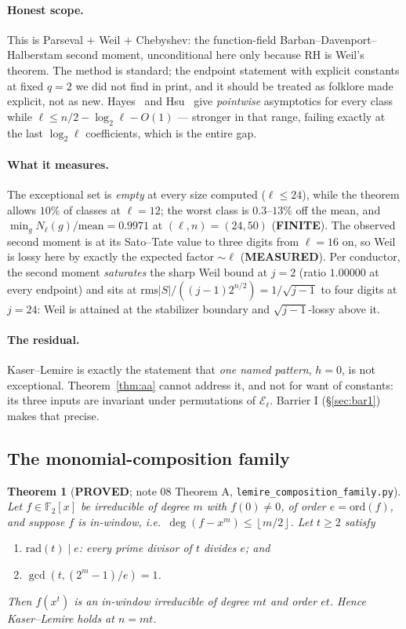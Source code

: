 \documentclass[10pt]{article}
\theoremstyle{plain}
\newtheorem{theorem}{Theorem}[section]
\theoremstyle{definition}
\newcommand{\F}{\mathbb F}
\newcommand{\E}{\mathcal E}
\newcommand{\flr}[1]{\left\lfloor #1\right\rfloor}
\newcommand{\proved}{\textcolor{proved}{\textsf{\textbf{\footnotesize PROVED}}}}
\newcommand{\finite}{\textcolor{finite}{\textsf{\textbf{\footnotesize FINITE}}}}
\newcommand{\measuredst}{\textcolor{measured}{\textsf{\textbf{\footnotesize MEASURED}}}}
\begin{document}
\paragraph{Honest scope.} This is Parseval $+$ Weil $+$ Chebyshev: the
function-field Barban--Davenport--Halberstam second moment, unconditional here
only because RH is Weil's theorem. The method is standard; the endpoint
statement with explicit constants at fixed $q=2$ we did not find in print, and
it should be treated as folklore made explicit, not as new. Hayes~\cite{Hayes}
and Hsu~\cite{Hsu} give \emph{pointwise} asymptotics for every class while
$\ell\le n/2-\log_2\ell-O(1)$ --- stronger in that range, failing exactly at the
last $\log_2\ell$ coefficients, which is the entire gap.

\paragraph{What it measures.} The exceptional set is \emph{empty} at every size
computed ($\ell\le24$), while the theorem allows $10\%$ of classes at
$\ell=12$; the worst class is $0.3$--$13\%$ off the mean, and
$\min_g N_\ell(g)/\mathrm{mean}=0.9971$ at $(\ell,n)=(24,50)$ (\finite). The
observed second moment is at its Sato--Tate value to three digits from
$\ell=16$ on, so Weil is lossy here by exactly the expected factor $\sim\ell$
(\measuredst). Per conductor, the second moment \emph{saturates} the sharp Weil
bound at $j=2$ (ratio $1.00000$ at every endpoint) and sits at
$\mathrm{rms}|S|/((j-1)2^{n/2})=1/\sqrt{j-1}$ to four digits at $j=24$: Weil is
attained at the stabilizer boundary and $\sqrt{j-1}$-lossy above it.

\paragraph{The residual.} Kaser--Lemire is exactly the statement that
\emph{one named pattern}, $h=0$, is not exceptional. Theorem~\ref{thm:aa}
cannot address it, and not for want of constants: its three inputs are
invariant under permutations of $\E_\ell$. Barrier I
(\S\ref{sec:bar1}) makes that precise.

\subsection{The monomial-composition family}

\begin{theorem}[\proved; note 08 Theorem A, \texttt{lemire\_composition\_family.py}]
\label{thm:family}
Let $f\in\F_2[x]$ be irreducible of degree $m$ with $f(0)\ne0$, of order
$e=\mathrm{ord}(f)$, and suppose $f$ is in-window, i.e.\
$\deg(f-x^m)\le\flr{m/2}$. Let $t\ge2$ satisfy
\begin{enumerate}[label=(\roman*)]
\item $\mathrm{rad}(t)\mid e$: every prime divisor of $t$ divides $e$; and
\item $\gcd(t,(2^m-1)/e)=1$.
\end{enumerate}
Then $f(x^t)$ is an in-window irreducible of degree $mt$ and order $et$. Hence
Kaser--Lemire holds at $n=mt$.
\end{theorem}
\end{document}
